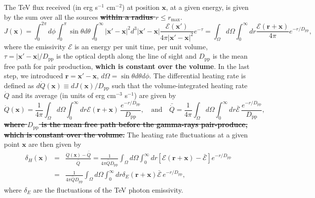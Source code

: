 \documentclass[numberedappendix]{emulateapj}
\newcommand\ALc[1]{{\color{red} \bf #1}} %
\newcommand\Pc[1]{{\color{cyan} \bf #1}} %
\begin{document}
{The TeV flux received (in erg s$^{-1}$ cm$^{-2}$) at position $\mathbf{x}$, at a given energy, is given by the sum over all the sources \ALc{\sout{within a radius $r\leqslant r_{\mathrm{max}}$}}.
\begin{equation}
  \label{eq:flux_recu0}
  J(\mathbf{x})=
  \int_{0}^{2\pi}d\phi\int_{0}^{\pi}\sin\theta d\theta\int_0^{\infty}|\mathbf{x}'-\mathbf{x}|^2 d^3|\mathbf{x}'-\mathbf{x}|
  \frac{\mathcal{E}(\mathbf{x}') }{4\pi |\mathbf{x}'-\mathbf{x}|^2} e^{-\tau}
  =\int_{\Omega} d\Omega\int_0^{\infty} dr \frac{\mathcal{E}(\mathbf{r}+\mathbf{x}) }{4\pi } e^{- r/D_{\mathrm{pp}}},
\end{equation}
where the emissivity $\mathcal{E}$ is an energy per unit time, per unit volume, $\tau=|\mathbf{x}'-\mathbf{x}|/D_{\mathrm{pp}}$ is the optical depth along the line of sight and $D_{\mathrm{pp}}$ is the mean free path for pair production, \ALc{which is constant over the volume}. In the last step, we introduced $\mathbf{r}=\mathbf{x}'-\mathbf{x}$, $d\Omega=\sin\theta d\theta d\phi$. The differential heating rate is defined as $d\dot{Q}(\mathbf{x})\equiv dJ(\mathbf{x})/D_{\mathrm{pp}}$ such that the volume-integrated heating rate $\dot{Q}$ and its average (in units of erg cm$^{-3}$ s$^{-1}$) are given by 
\begin{equation}
  \label{eq:heating_rate0}
  \dot{Q}(\mathbf{x})=
  \frac{1}{4\pi}   \int_{\Omega}d\Omega\int_0^{\infty} dr \mathcal{E}(\mathbf{r}+\mathbf{x})\, \frac{e^{-r/D_{\mathrm{pp}}}}{D_{\mathrm{pp}}},\quad\mbox{and}\quad
  \bar{\dot{Q}}= \frac{1}{4\pi}   \int_{\Omega}d\Omega\int_0^{\infty} dr \bar{\mathcal{E}} \,\frac{e^{-r/D_{\mathrm{pp}}}}{D_{\mathrm{pp}}} ,
\end{equation}
\ALc{\sout{where $D_{\mathrm{pp}}$ is the mean free path before the gamma-rays pair-produce, which is constant over the volume.}}
The heating rate fluctuations at a given point $\mathbf{x}$ are then given by 
\begin{eqnarray}
  \label{eq:heat_fluc_newt0}
  \delta_H(\mathbf{x})&=&\frac{\dot{Q}(\mathbf{x})-\bar{\dot{Q}}}{\bar{\dot{Q}}}=
  \frac{1}{4\pi\bar{\dot{Q}}D_{\mathrm{pp}}} \int_{\Omega}d\Omega\int_0^{\infty} dr 
  [\mathcal{E}(\mathbf{r}+\mathbf{x})-\bar{\mathcal{E}}]e^{-r/D_{\mathrm{pp}}} \nonumber\\
  &=&\frac{1}{4\pi\bar{\dot{Q}}D_{\mathrm{pp}}}\int_{\Omega}d\Omega\int_0^{\infty} dr \delta_E(\mathbf{r}+\mathbf{x})\bar{\mathcal{E}}\,e^{-r/D_{\mathrm{pp}}} ,
\end{eqnarray}
where $\delta_E$ are the fluctuations of the TeV photon emissivity. %



}
\end{document}
